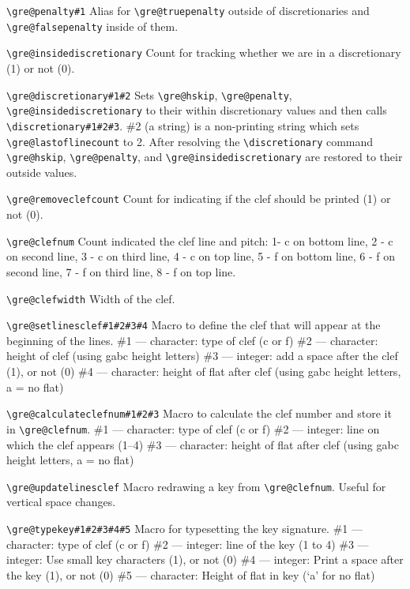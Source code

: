 \verb=\gre@penalty#1=%
	Alias for \verb=\gre@truepenalty= outside of discretionaries and \verb=\gre@falsepenalty= inside of them.

\verb=\gre@insidediscretionary=%
	Count for tracking whether we are in a discretionary (1) or not (0).

\verb=\gre@discretionary#1#2=%
	Sets \verb=\gre@hskip=, \verb=\gre@penalty=, \verb=\gre@insidediscretionary= to their within discretionary values and then calls \verb=\discretionary#1#2#3=.  \#2 (a string) is a non-printing string which sets \verb=\gre@lastoflinecount= to 2.  After resolving the \verb=\discretionary= command \verb=\gre@hskip=, \verb=\gre@penalty=, and \verb=\gre@insidediscretionary= are restored to their outside values.

\verb=\gre@removeclefcount=%
	Count for indicating if the clef should be printed (1) or not (0).

\verb=\gre@clefnum=%
	Count indicated the clef line and pitch: 1- c on bottom line, 2 - c on second line, 3 - c on third line, 4 - c on top line, 5 - f on bottom line, 6 - f on second line, 7 - f on third line, 8 - f on top line.

\verb=\gre@clefwidth=%
	Width of the clef.

\verb=\gre@setlinesclef#1#2#3#4=%
	Macro to define the clef that will appear at the beginning of the lines.
	\#1 --- character: type of clef (c or f)
	\#2 --- character: height of clef (using gabc height letters)
	\#3 --- integer: add a space after the clef (1), or not (0)
	\#4 --- character: height of flat after clef (using gabc height letters, a = no flat)

\verb=\gre@calculateclefnum#1#2#3=%
	Macro to calculate the clef number and store it in \verb=\gre@clefnum=.
	\#1 --- character: type of clef (c or f)
	\#2 --- integer: line on which the clef appears (1--4)
	\#3 --- character: height of flat after clef (using gabc height letters, a = no flat)

\verb=\gre@updatelinesclef=%
	Macro redrawing a key from \verb=\gre@clefnum=.  Useful for vertical space changes.
	
\verb=\gre@typekey#1#2#3#4#5=%
	Macro for typesetting the key signature.
	\#1 --- character: type of clef (c or f)
	\#2 --- integer: line of the key (1 to 4)
	\#3 --- integer: Use small key characters (1), or not (0)
	\#4 --- integer: Print a space after the key (1), or not (0)
	\#5 --- character: Height of flat in key (‘a’ for no flat)

